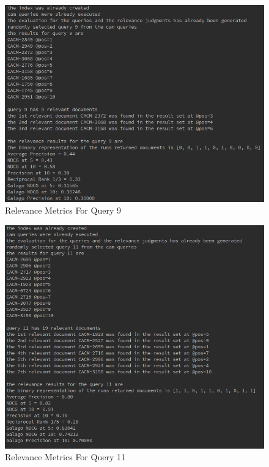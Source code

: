 \documentclass[11pt]{article}
\newenvironment{code}{\captionsetup{type=listing}}{}
\begin{document}
\begin{figure}[H]
\centering
\includegraphics[scale=0.6]{q1_run3.png}
\caption{Relevance Metrics For Query 9}
\label{fig:cam_rel9}
\end{figure}
\begin{figure}[H]
\centering
\includegraphics[scale=0.6]{q1run1.png}
\caption{Relevance Metrics For Query 11}
\label{fig:cam_rel11}
\end{figure}
\begin{code}
\label{code:q1}
\end{code}
\newpage
\end{document}
